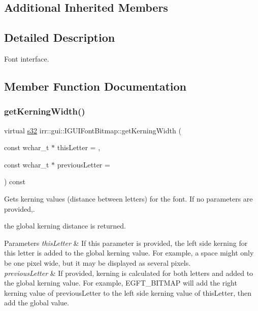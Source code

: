 \subsection*{Additional Inherited Members}


\subsection{Detailed Description}
Font interface. 

\subsection{Member Function Documentation}
\mbox{\label{classirr_1_1gui_1_1IGUIFontBitmap_a7bdeaea45745a10e09f7769ec3b95a12}} 
\subsubsection{\texorpdfstring{get\+Kerning\+Width()}{getKerningWidth()}}
{\footnotesize\ttfamily virtual \hyperlink{namespaceirr_ac66849b7a6ed16e30ebede579f9b47c6}{s32} irr\+::gui\+::\+I\+G\+U\+I\+Font\+Bitmap\+::get\+Kerning\+Width (\begin{DoxyParamCaption}\item[{const wchar\+\_\+t $\ast$}]{this\+Letter = {},  }\item[{const wchar\+\_\+t $\ast$}]{previous\+Letter = {} }\end{DoxyParamCaption}) const\hspace{0.3cm}{\ttfamily [pure virtual]}}



Gets kerning values (distance between letters) for the font. If no parameters are provided,. 

the global kerning distance is returned. 
\begin{DoxyParams}{Parameters}
{\em this\+Letter} & If this parameter is provided, the left side kerning for this letter is added to the global kerning value. For example, a space might only be one pixel wide, but it may be displayed as several pixels. \\
\hline
{\em previous\+Letter} & If provided, kerning is calculated for both letters and added to the global kerning value. For example, E\+G\+F\+T\+\_\+\+B\+I\+T\+M\+AP will add the right kerning value of previous\+Letter to the left side kerning value of this\+Letter, then add the global value. \\
\hline
\end{DoxyParams}


